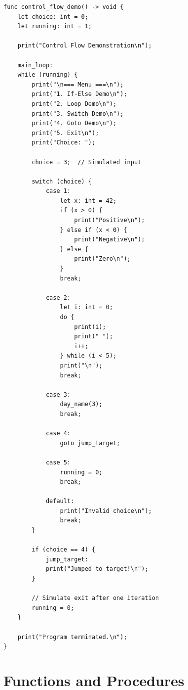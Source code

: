\documentclass[12pt,a4paper,oneside]{book}
\begin{document}
\begin{lstlisting}[style=algo, caption={Complete Control Flow Demo}]
func control_flow_demo() -> void {
    let choice: int = 0;
    let running: int = 1;
    
    print("Control Flow Demonstration\n");
    
    main_loop:
    while (running) {
        print("\n=== Menu ===\n");
        print("1. If-Else Demo\n");
        print("2. Loop Demo\n");
        print("3. Switch Demo\n");
        print("4. Goto Demo\n");
        print("5. Exit\n");
        print("Choice: ");
        
        choice = 3;  // Simulated input
        
        switch (choice) {
            case 1:
                let x: int = 42;
                if (x > 0) {
                    print("Positive\n");
                } else if (x < 0) {
                    print("Negative\n");
                } else {
                    print("Zero\n");
                }
                break;
                
            case 2:
                let i: int = 0;
                do {
                    print(i);
                    print(" ");
                    i++;
                } while (i < 5);
                print("\n");
                break;
                
            case 3:
                day_name(3);
                break;
                
            case 4:
                goto jump_target;
                
            case 5:
                running = 0;
                break;
                
            default:
                print("Invalid choice\n");
                break;
        }
        
        if (choice == 4) {
            jump_target:
            print("Jumped to target!\n");
        }
        
        // Simulate exit after one iteration
        running = 0;
    }
    
    print("Program terminated.\n");
}
\end{lstlisting}

\chapter{Functions and Procedures}
\end{document}
